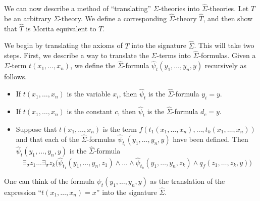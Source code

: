 We can now describe a method of ``translating'' $\Sigma$-theories into
$\widehat{\Sigma}$-theories.  Let $T$ be an arbitrary $\Sigma$-theory.
We define a corresponding $\widehat{\Sigma}$-theory $\widehat{T}$, and
then show that $\widehat{T}$ is Morita equivalent to $T$.

We begin by translating the axioms of $T$ into the signature
$\widehat{\Sigma}$.  This will take two steps. First, we describe a
way to translate the $\Sigma$-terms into $\widehat{\Sigma}$-formulas.
Given a $\Sigma$-term $t(x_1,\ldots, x_n)$, we define the
$\widehat{\Sigma}$-formula $\widehat{\psi}_t(y_1,\ldots, y_n, y)$
recursively as follows.
\begin{itemize}
\item If $t(x_1,\ldots, x_n)$ is the variable $x_i$, then
  $\widehat{\psi}_t$ is the $\widehat{\Sigma}$-formula $y_i=y$.
\item If $t(x_1,\ldots, x_n)$ is the constant $c$, then
  $\widehat{\psi}_t$ is the $\widehat{\Sigma}$-formula $d_{c}=y$.
\item Suppose that $t(x_1,\ldots, x_n)$ is the term $f(t_1(x_1,\ldots,
  x_n),\ldots, t_k(x_1,\ldots, x_n))$ and that each of the
  $\widehat{\Sigma}$-formulas $\widehat{\psi}_{t_i}(y_1,\ldots, y_n,
  y)$ have been defined. Then $\widehat{\psi}_t(y_1,\ldots, y_n, y)$
  is the $\widehat{\Sigma}$-formula
$$
\exists_{\sigma}z_1\ldots \exists_\sigma z_k\big(\widehat{\psi}_{t_1}(y_1,\ldots, y_n, z_1)\land\ldots\land\widehat{\psi}_{t_k}(y_1,\ldots, y_n, z_k)\land q_{f}(z_1,\ldots, z_k, y)\big)
$$
\end{itemize}
One can think of the formula $\psi_t(y_1,\ldots, y_n, y)$ as the
translation of the expression ``$t(x_1,\ldots, x_n)=x$'' into the
signature $\widehat{\Sigma}$.

